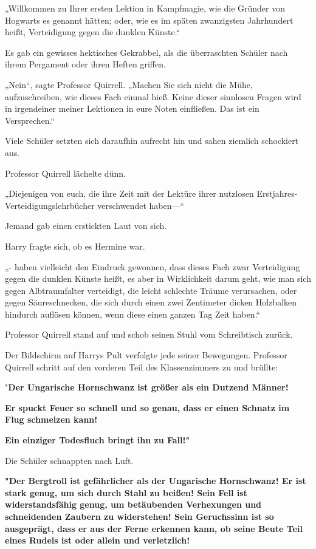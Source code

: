 {„Willkommen zu Ihrer ersten Lektion in Kampfmagie, wie die Gründer von Hogwarts es genannt hätten; oder, wie es im späten zwanzigsten Jahrhundert heißt, Verteidigung gegen die dunklen Künste.“

Es gab ein gewisses hektisches Gekrabbel, als die überraschten Schüler nach ihrem Pergament oder ihren Heften griffen.

„Nein“, sagte Professor Quirrell. „Machen Sie sich nicht die Mühe, aufzuschreiben, wie dieses Fach einmal hieß. Keine dieser sinnlosen Fragen wird in irgendeiner meiner Lektionen in eure Noten einfließen. Das ist ein Versprechen.“

Viele Schüler setzten sich daraufhin aufrecht hin und sahen ziemlich schockiert aus.

Professor Quirrell lächelte dünn.

„Diejenigen von euch, die ihre Zeit mit der Lektüre ihrer nutzlosen Erstjahres-Verteidigungslehrbücher verschwendet haben—“

Jemand gab einen erstickten Laut von sich.

Harry fragte sich, ob es Hermine war.

„- haben vielleicht den Eindruck gewonnen, dass dieses Fach zwar Verteidigung gegen die dunklen Künste heißt, es aber in Wirklichkeit darum geht, wie man sich gegen Albtraumfalter verteidigt, die leicht schlechte Träume verursachen, oder gegen Säureschnecken, die sich durch einen zwei Zentimeter dicken Holzbalken hindurch auflösen können, wenn diese einen ganzen Tag Zeit haben.“

Professor Quirrell stand auf und schob seinen Stuhl vom Schreibtisch zurück.

Der Bildschirm auf Harrys Pult verfolgte jede seiner Bewegungen. Professor Quirrell schritt auf den vorderen Teil des Klassenzimmers zu und brüllte:

"\textbf{Der Ungarische Hornschwanz ist größer als ein Dutzend Männer!}

\textbf{Er spuckt Feuer so schnell und so genau, dass er einen Schnatz im Flug schmelzen kann!}

\textbf{Ein einziger Todesfluch bringt ihn zu Fall!"}

Die Schüler schnappten nach Luft.

\textbf{"Der Bergtroll ist gefährlicher als der Ungarische Hornschwanz! Er ist stark genug, um sich durch Stahl zu beißen! Sein Fell ist widerstandsfähig genug, um betäubenden Verhexungen und schneidenden Zaubern zu widerstehen! Sein Geruchssinn ist so ausgeprägt, dass er aus der Ferne erkennen kann, ob seine Beute Teil eines Rudels ist oder allein und verletzlich!}

}
